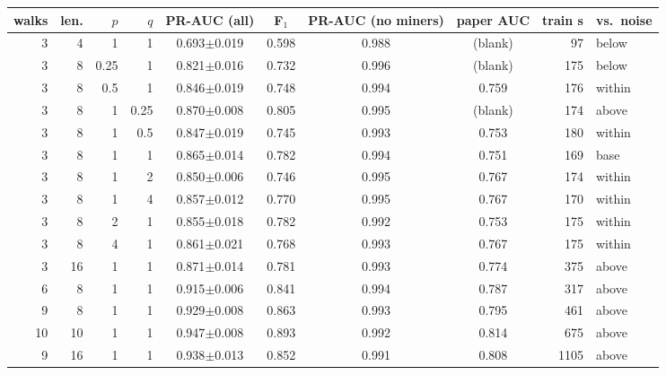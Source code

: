 \begin{tabular}{rrrr cc c c r l}
\toprule
walks & len. & $p$ & $q$ & PR-AUC (all) & F$_1$ & PR-AUC (no miners) & paper AUC & train s & vs.\ noise\\
\midrule
3 & 4 & 1 & 1 & 0.693{\scriptsize$\pm$0.019} & 0.598 & 0.988 & (blank) & 97 & below\\
3 & 8 & 0.25 & 1 & 0.821{\scriptsize$\pm$0.016} & 0.732 & 0.996 & (blank) & 175 & below\\
3 & 8 & 0.5 & 1 & 0.846{\scriptsize$\pm$0.019} & 0.748 & 0.994 & 0.759 & 176 & within\\
3 & 8 & 1 & 0.25 & 0.870{\scriptsize$\pm$0.008} & 0.805 & 0.995 & (blank) & 174 & above\\
3 & 8 & 1 & 0.5 & 0.847{\scriptsize$\pm$0.019} & 0.745 & 0.993 & 0.753 & 180 & within\\
3 & 8 & 1 & 1 & 0.865{\scriptsize$\pm$0.014} & 0.782 & 0.994 & 0.751 & 169 & base\\
3 & 8 & 1 & 2 & 0.850{\scriptsize$\pm$0.006} & 0.746 & 0.995 & 0.767 & 174 & within\\
3 & 8 & 1 & 4 & 0.857{\scriptsize$\pm$0.012} & 0.770 & 0.995 & 0.767 & 170 & within\\
3 & 8 & 2 & 1 & 0.855{\scriptsize$\pm$0.018} & 0.782 & 0.992 & 0.753 & 175 & within\\
3 & 8 & 4 & 1 & 0.861{\scriptsize$\pm$0.021} & 0.768 & 0.993 & 0.767 & 175 & within\\
3 & 16 & 1 & 1 & 0.871{\scriptsize$\pm$0.014} & 0.781 & 0.993 & 0.774 & 375 & above\\
6 & 8 & 1 & 1 & 0.915{\scriptsize$\pm$0.006} & 0.841 & 0.994 & 0.787 & 317 & above\\
9 & 8 & 1 & 1 & 0.929{\scriptsize$\pm$0.008} & 0.863 & 0.993 & 0.795 & 461 & above\\
10 & 10 & 1 & 1 & 0.947{\scriptsize$\pm$0.008} & 0.893 & 0.992 & 0.814 & 675 & above\\
9 & 16 & 1 & 1 & 0.938{\scriptsize$\pm$0.013} & 0.852 & 0.991 & 0.808 & 1105 & above\\
\bottomrule
\end{tabular}